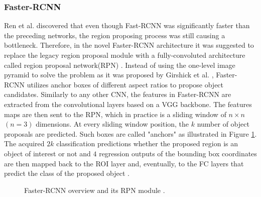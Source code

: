 \subsubsection{Faster-RCNN} 
Ren et al. \cite{ima} discovered that even though Fast-RCNN was significantly faster than the preceding networks, the region proposing process was still causing a bottleneck. Therefore, in the novel Faster-RCNN \cite{ima} architecture it was suggested to replace the legacy region proposal module with a fully-convoluted architecture called region proposal network(RPN) \cite{Girshick2013}. Instead of using the one-level image pyramid to solve the problem as it was proposed by Girshick et al. \cite{Girshick2015}, Faster-RCNN utilizes anchor boxes of different aspect ratios to propose object candidates. Similarly to any other CNN, the features in Faster-RCNN are extracted from the convolutional layers based on a VGG backbone. The features maps are then sent to the RPN, which in practice is a sliding window  of $n\times n$ $(n=3)$ dimensions. At every sliding window position, the $k$ number of object proposals are predicted. Such boxes are called "anchors" as illustrated in Figure \ref{fig:faster_rcnn}. The acquired $2k$ classification predictions whether the proposed region is an object of interest or not and $4$ regression outputs of the bounding box coordinates are then mapped back to the ROI layer and, eventually, to the FC layers that predict the class of the proposed object \cite{ima}. 


\begin{figure}[htb]
    \centering
    \qquad
    \caption{Faster-RCNN overview and its RPN module \cite{ima}.}
    \label{fig:faster_rcnn}%
\end{figure}
\FloatBarrier

